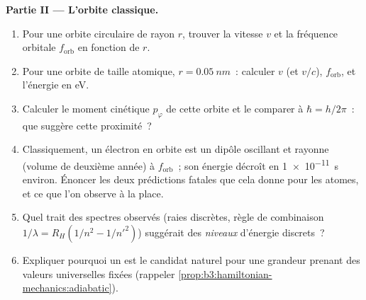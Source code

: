 \begin{problem}
\medskip\noindent\textbf{Partie II --- L'orbite classique.}
\begin{enumerate}[resume]
  \item Pour une orbite circulaire de rayon $r$, trouver la vitesse $v$
        et la fréquence orbitale $f_{\text{orb}}$ en fonction de $r$.
  \item Pour une orbite de taille atomique, $r = \qty{0.05}{nm}$~:
        calculer $v$ (et $v/c$), $f_{\text{orb}}$, et l'énergie en eV.
  \item Calculer le moment cinétique $p_\varphi$ de cette orbite et
        le comparer à $\hbar = h/2\pi$~: que suggère cette proximité~?
  \item Classiquement, un électron en orbite est un dipôle oscillant et
        rayonne (volume de deuxième année) à $f_{\text{orb}}$~; son
        énergie décroît en \qty{1e-11}{s} environ. Énoncer les deux
        prédictions fatales que cela donne pour les atomes, et ce que
        l'on observe à la place.
  \item Quel trait des spectres observés (raies discrètes, règle de
        combinaison $1/\lambda = R_H(1/n^2 - 1/n'^2)$) suggérait des
        \emph{niveaux} d'énergie discrets~?
  \item Expliquer pourquoi un \emph{} est le
        candidat naturel pour une grandeur prenant des valeurs
        universelles fixées
        (rappeler \cref{prop:b3:hamiltonian-mechanics:adiabatic}).
\end{enumerate}


\end{problem}
